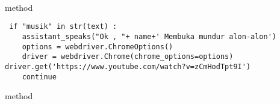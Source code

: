 \\
\\
\\
\\
\\
\\
\\
\\
\\
\\
\\
\\
\\
\\
\\
\\
\\
\\
\\
\\
\\
\\
\\
\\
\\
\\
\\
\\
method 
\begin{lstlisting}
 if "musik" in str(text) :
    assistant_speaks("Ok , "+ name+' Membuka mundur alon-alon')
    options = webdriver.ChromeOptions()
    driver = webdriver.Chrome(chrome_options=options)        driver.get('https://www.youtube.com/watch?v=zCmHodTpt9I')
    continue
\end{lstlisting}
method
\\
\\
\\
\\
\\
\\
\\
\\
\\
\\
\\
\\
\\
\\
\\
\\
\\
\\
\\
\\
\\
\\
\\
\\
